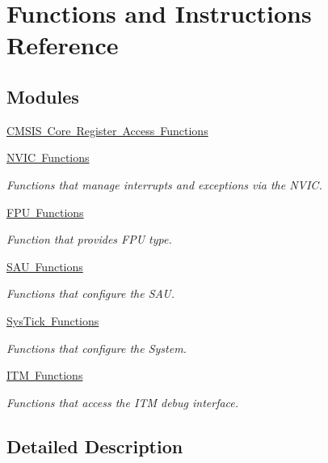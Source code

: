 \hypertarget{group___c_m_s_i_s___core___function_interface}{}\section{Functions and Instructions Reference}
\label{group___c_m_s_i_s___core___function_interface}
\subsection*{Modules}
\begin{DoxyCompactItemize}
\item 
\mbox{\hyperlink{group___c_m_s_i_s___core___reg_acc_functions}{C\+M\+S\+I\+S Core Register Access Functions}}
\item 
\mbox{\hyperlink{group___c_m_s_i_s___core___n_v_i_c_functions}{N\+V\+I\+C Functions}}
\begin{DoxyCompactList}\small\item\em Functions that manage interrupts and exceptions via the N\+V\+IC. \end{DoxyCompactList}\item 
\mbox{\hyperlink{group___c_m_s_i_s___core___fpu_functions}{F\+P\+U Functions}}
\begin{DoxyCompactList}\small\item\em Function that provides F\+PU type. \end{DoxyCompactList}\item 
\mbox{\hyperlink{group___c_m_s_i_s___core___s_a_u_functions}{S\+A\+U Functions}}
\begin{DoxyCompactList}\small\item\em Functions that configure the S\+AU. \end{DoxyCompactList}\item 
\mbox{\hyperlink{group___c_m_s_i_s___core___sys_tick_functions}{Sys\+Tick Functions}}
\begin{DoxyCompactList}\small\item\em Functions that configure the System. \end{DoxyCompactList}\item 
\mbox{\hyperlink{group___c_m_s_i_s__core___debug_functions}{I\+T\+M Functions}}
\begin{DoxyCompactList}\small\item\em Functions that access the I\+TM debug interface. \end{DoxyCompactList}\end{DoxyCompactItemize}


\subsection{Detailed Description}
